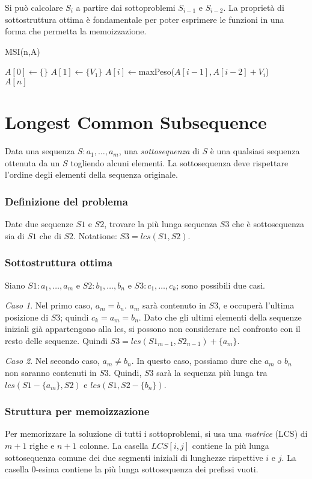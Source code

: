 \documentclass[11pt]{book}
\begin{document}
Si può calcolare $S_i$ a partire dai sottoproblemi $S_{i-1}$ e $S_{i-2}$.
La proprietà di sottostruttura ottima è fondamentale per poter esprimere le funzioni in una forma che permetta la memoizzazione.
\begin{algorithm}
    \caption{MSI(n,A)}
    \begin{algorithmic}
        \State $A[0]\gets \{\}$
        \State $A[1]\gets \{V_1\}$
            \State $A[i]\gets$maxPeso($A[i-1], A[i-2]+V_i$)
        \EndFor\\
        \Return $A[n]$
    \end{algorithmic}
\end{algorithm}
\section{Longest Common Subsequence}
Data una sequenza $S:a_1,\dots,a_m$, una \textit{sottosequenza} di $S$ è una qualsiasi sequenza ottenuta da un $S$ togliendo 
alcuni elementi. La sottosequenza deve rispettare l'ordine degli elementi della sequenza originale.
\subsubsection{Definizione del problema}
Date due sequenze $S1$ e $S2$, trovare la più lunga sequenza $S3$ che è sottosequenza sia di $S1$ che di $S2$. Notatione:
$S3=lcs(S1,S2)$.
\subsubsection{Sottostruttura ottima}
Siano $S1:a_1,\dots,a_m$ e $S2:b_1,\dots,b_n$ e $S3:c_1,\dots,c_k$; sono possibili due casi.

\textit{Caso 1}. Nel primo caso, $a_m=b_n$. $a_m$ sarà contenuto in $S3$, e occuperà l'ultima posizione di $S3$; quindi 
$c_k=a_m=b_n$. Dato che gli ultimi elementi della sequenze iniziali già appartengono alla lcs, si possono non considerare
nel confronto con il resto delle sequenze. Quindi $S3=lcs(S1_{m-1},S2_{n-1})+\{a_m\}$.

\textit{Caso 2}. Nel secondo caso, $a_m\neq b_n$. In questo caso, possiamo dure che $a_m$ o $b_n$ non saranno contenuti 
in $S3$. Quindi, $S3$ sarà la sequenza più lunga tra $lcs(S1-\{a_m\},S2)$ e $lcs(S1,S2-\{b_n\})$.
\subsubsection{Struttura per memoizzazione}
Per memorizzare la soluzione di tutti i sottoproblemi, si usa una \textit{matrice} (LCS) di $m+1$ righe e $n+1$ colonne. La 
casella $LCS[i,j]$ contiene la più lunga sottosequenza comune dei due segmenti iniziali di lunghezze rispettive $i$ e $j$.
La casella 0-esima contiene la più lunga sottosequenza dei prefissi vuoti.
\end{document}
